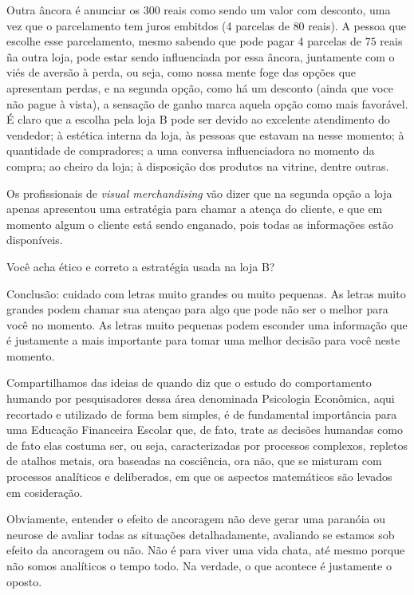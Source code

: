 Outra âncora é anunciar os $300$ reais como sendo um valor com desconto, uma vez que o parcelamento tem juros embitdos (4 parcelas de $80$ reais). A pessoa que escolhe esse parcelamento, mesmo sabendo que pode pagar 4 parcelas de $75$ reais ña outra loja, pode estar sendo influenciada por essa âncora, juntamente com o viés de aversão à perda, ou seja, como nossa mente foge das opções que apresentam perdas, e na segunda opção, como há um desconto (ainda que voce não pague à vista), a sensação de ganho marca aquela opção como mais favorável. É claro que a escolha pela loja B pode ser devido ao excelente atendimento do vendedor; à estética interna da loja, às pessoas que estavam na nesse momento; à quantidade de compradores; a uma conversa influenciadora no momento da compra; ao cheiro da loja; à disposição dos produtos na vitrine, dentre outras.

Os profissionais de \textit{visual merchandising} vão dizer que na segunda opção a loja apenas apresentou uma estratégia para chamar a atença do cliente, e que em momento algum o cliente está sendo enganado, pois todas as informações estão disponíveis. 

\begin{reflection}
{Você acha ético e correto a estratégia usada na loja B}?
\end{reflection}

Conclusão: cuidado com letras muito grandes ou muito pequenas. As letras muito grandes podem chamar sua atençao para algo que pode não ser o melhor para você no momento. As letras muito pequenas podem esconder uma informação que é justamente a mais importante para tomar uma melhor decisão para você neste momento.

Compartilhamos das ideias de \cite{muniz2018} quando diz que o estudo do comportamento humando por pesquisadores dessa área denominada Psicologia Econômica, aqui recortado e utilizado de forma bem simples, é  de fundamental importância para uma Educação Financeira Escolar que, de fato, trate as decisões humandas como de fato elas costuma ser, ou seja, caracterizadas por processos complexos, repletos de atalhos metais, ora baseadas na cosciência, ora não, que se misturam com processos analíticos e deliberados, em que os aspectos matemáticos são levados em cosideração.

Obviamente, entender o efeito de ancoragem não deve gerar uma paranóia ou neurose de avaliar todas as situações detalhadamente, avaliando se estamos sob efeito da ancoragem ou não. Não é para viver uma vida chata, até mesmo porque não somos analíticos o tempo todo. Na verdade, o que acontece é justamente o oposto.

